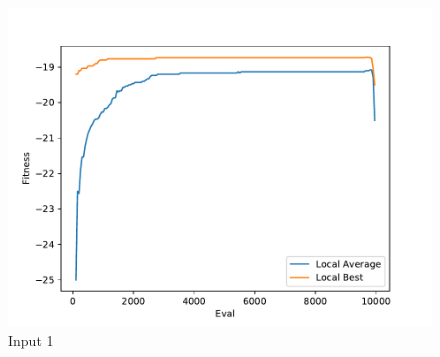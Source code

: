 \documentclass{standalone}
\begin{document}
\begin{figure}[!htb]
	\caption{Input 1}
	\label{fig:graph_1028}
	\includegraphics[width=\textwidth]{../graphs/graphs/1028.pdf}
\end{figure}
\end{document}
